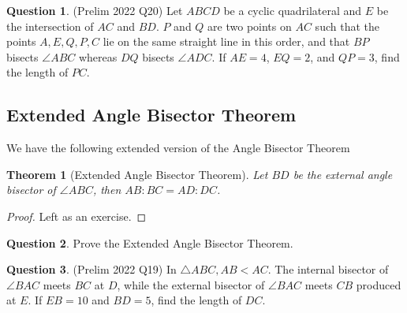 \documentclass{article}
\newtheorem{theorem}{Theorem}[section]
\theoremstyle{definition}
\newtheorem{question}{Question}
\begin{document}
\begin{question}
	(Prelim 2022 Q20) Let $ABCD$ be a cyclic quadrilateral and $E$ be the intersection of $AC$ and $BD$. $P$ and $Q$ are two points on $AC$ such that the points $A,E,Q,P,C$ lie on the same straight line in this order, and that $BP$ bisects $\angle ABC$ whereas $DQ$ bisects $\angle ADC$. If $AE=4$, $EQ=2$, and $QP=3$, find the length of $PC$.
\end{question}
\newpage

\subsection{Extended Angle Bisector Theorem}
We have the following extended version of the Angle Bisector Theorem

\begin{mdframed}
	\begin{theorem}[Extended Angle Bisector Theorem]
		Let $BD$ be the external angle bisector of $\angle ABC$, then $AB:BC = AD:DC$.
	\end{theorem}
	\begin{figure}[H]
		\centering
	\end{figure}
\end{mdframed}
\begin{proof}
	Left as an exercise.
\end{proof}
\begin{question}
	Prove the Extended Angle Bisector Theorem.
\end{question}
\vspace{4cm}
\begin{question}
	(Prelim 2022 Q19) In $\triangle A B C, A B<A C$. The internal bisector of $\angle B A C$ meets $B C$ at $D$, while the external bisector of $\angle B A C$ meets $C B$ produced at $E$. If $EB=10$ and $BD=5$, find the length of $DC$.
\end{question}
\end{document}
